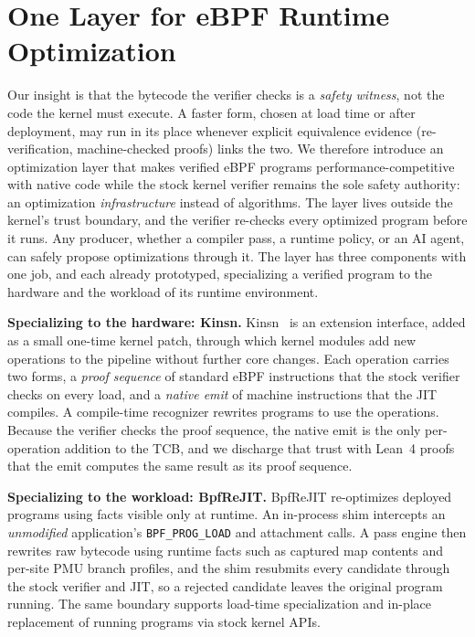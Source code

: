 \section{One Layer for eBPF Runtime Optimization}

Our insight is that the bytecode the verifier checks is a \emph{safety witness}, not the code the kernel must execute. A faster form, chosen at load time or after deployment, may run in its place whenever explicit equivalence evidence (re-verification, machine-checked proofs) links the two. We therefore introduce an optimization layer that makes verified eBPF programs performance-competitive with native code while the stock kernel verifier remains the sole safety authority: an optimization \emph{infrastructure} instead of algorithms. The layer lives outside the kernel's trust boundary, and the verifier re-checks every optimized program before it runs. Any producer, whether a compiler pass, a runtime policy, or an AI agent, can safely propose optimizations through it.  The layer has three components with one job, and each already prototyped, specializing a verified program to the hardware and the workload of its runtime environment.

\noindent\textbf{Specializing to the hardware: Kinsn.}  Kinsn~\cite{zheng2026kinsn} is an extension interface, added as a small one-time kernel patch, through which kernel modules add new operations to the pipeline without further core changes.  Each operation carries two forms, a \emph{proof sequence} of standard eBPF instructions that the stock verifier checks on every load, and a \emph{native emit} of machine instructions that the JIT compiles.  A compile-time recognizer rewrites programs to use the operations. Because the verifier checks the proof sequence, the native emit is the only per-operation addition to the TCB, and we discharge that trust with Lean~4 proofs that the emit computes the same result as its proof sequence.

\noindent\textbf{Specializing to the workload: BpfReJIT.}  BpfReJIT re-optimizes deployed programs using facts visible only at runtime.  An in-process shim intercepts an \emph{unmodified} application's \texttt{BPF\_PROG\_LOAD} and attachment calls. A pass engine then rewrites raw bytecode using runtime facts such as captured map contents and per-site PMU branch profiles, and the shim resubmits every candidate through the stock verifier and JIT, so a rejected candidate leaves the original program running.  The same boundary supports load-time specialization and in-place replacement of running programs via stock kernel APIs.

